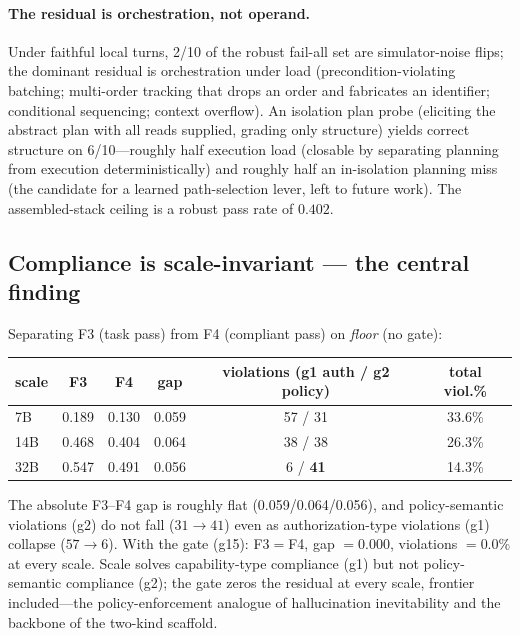 \paragraph{The residual is orchestration, not operand.} Under faithful local turns, 2/10 of the robust fail-all set are simulator-noise flips; the dominant residual is orchestration under load (precondition-violating batching; multi-order tracking that drops an order and fabricates an identifier; conditional sequencing; context overflow). An isolation plan probe (eliciting the abstract plan with all reads supplied, grading only structure) yields correct structure on 6/10---roughly half execution load (closable by separating planning from execution deterministically) and roughly half an in-isolation planning miss (the candidate for a learned path-selection lever, left to future work). The assembled-stack ceiling is a robust pass rate of $0.402$.

\subsection{Compliance is scale-invariant --- the central finding}\label{sec:results-compliance}%
Separating F3 (task pass) from F4 (compliant pass) on \emph{floor} (no gate):
\begin{center}\small\begin{tabular}{lccccc}
\toprule scale & F3 & F4 & gap & violations (g1 auth / g2 policy) & total viol.\% \\ \midrule
7B  & 0.189 & 0.130 & 0.059 & 57 / 31 & 33.6\% \\
14B & 0.468 & 0.404 & 0.064 & 38 / 38 & 26.3\% \\
32B & 0.547 & 0.491 & 0.056 & 6 / \textbf{41} & 14.3\% \\ \bottomrule
\end{tabular}\end{center}
The absolute F3--F4 gap is roughly flat (0.059/0.064/0.056), and policy-semantic violations (g2) do not fall ($31\to41$) even as authorization-type violations (g1) collapse ($57\to6$). With the gate (g15): F3${=}$F4, gap ${=}0.000$, violations ${=}0.0\%$ at every scale. Scale solves capability-type compliance (g1) but not policy-semantic compliance (g2); the gate zeros the residual at every scale, frontier included---the policy-enforcement analogue of hallucination inevitability and the backbone of the two-kind scaffold.

